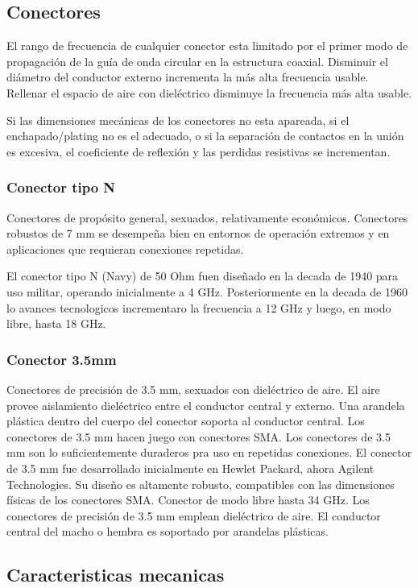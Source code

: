\subsection{Conectores}
El rango de frecuencia de cualquier conector esta limitado por el primer modo de propagación de la guía de onda circular en la estructura coaxial. Disminuir el diámetro del conductor externo incrementa la más alta frecuencia usable. Rellenar el espacio de aire con dieléctrico disminuye la frecuencia más alta usable.

Si las dimensiones mecánicas de los conectores no esta apareada, si el enchapado/plating no es el adecuado, o si la separación de contactos en la unión es excesiva, el coeficiente de reflexión y las perdidas resistivas se incrementan.

\subsubsection{Conector tipo N}
Conectores de propósito general, sexuados, relativamente económicos. Conectores robustos de 7 mm se desempeña bien en entornos de operación extremos y en aplicaciones que requieran conexiones repetidas.

El conector tipo N (Navy) de 50 Ohm fuen diseñado en la decada de 1940 para uso militar, operando inicialmente a 4 GHz. Posteriormente en la decada de 1960 lo avances tecnologicos incrementaro la frecuencia a 12 GHz y luego, en modo libre, hasta 18 GHz.

\subsubsection{Conector 3.5mm}

Conectores de precisión de 3.5 mm, sexuados con dieléctrico de aire. El aire provee aislamiento dieléctrico entre el conductor central y externo. Una arandela plástica dentro del cuerpo del conector soporta al conductor central.
Los conectores de 3.5 mm hacen juego con conectores SMA. Los conectores de 3.5 mm son lo suficientemente duraderos pra uso en repetidas conexiones.
El conector de 3.5 mm fue desarrollado inicialmente en Hewlet Packard, ahora Agilent Technologies. Su diseño es altamente robusto, compatibles con las dimensiones físicas de los conectores SMA. Conector de modo libre hasta 34 GHz. 
Los conectores de precisión de 3.5 mm emplean dieléctrico de aire. El conductor central del macho o hembra es soportado por arandelas plásticas.

\subsection{Caracteristicas mecanicas}

